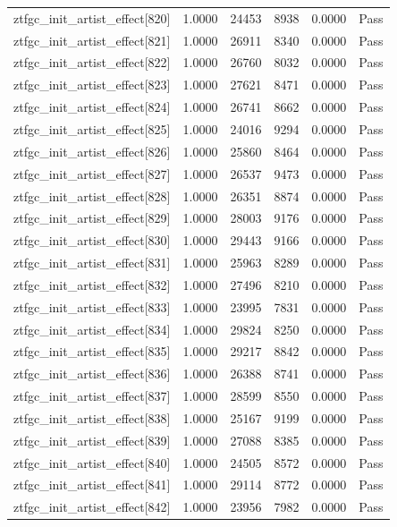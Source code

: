 \begin{table}[htbp]
\begin{tabular}{llrrll}
ztfgc\_init\_artist\_effect[820] & 1.0000 & 24453 & 8938 & 0.0000 & Pass \\
ztfgc\_init\_artist\_effect[821] & 1.0000 & 26911 & 8340 & 0.0000 & Pass \\
ztfgc\_init\_artist\_effect[822] & 1.0000 & 26760 & 8032 & 0.0000 & Pass \\
ztfgc\_init\_artist\_effect[823] & 1.0000 & 27621 & 8471 & 0.0000 & Pass \\
ztfgc\_init\_artist\_effect[824] & 1.0000 & 26741 & 8662 & 0.0000 & Pass \\
ztfgc\_init\_artist\_effect[825] & 1.0000 & 24016 & 9294 & 0.0000 & Pass \\
ztfgc\_init\_artist\_effect[826] & 1.0000 & 25860 & 8464 & 0.0000 & Pass \\
ztfgc\_init\_artist\_effect[827] & 1.0000 & 26537 & 9473 & 0.0000 & Pass \\
ztfgc\_init\_artist\_effect[828] & 1.0000 & 26351 & 8874 & 0.0000 & Pass \\
ztfgc\_init\_artist\_effect[829] & 1.0000 & 28003 & 9176 & 0.0000 & Pass \\
ztfgc\_init\_artist\_effect[830] & 1.0000 & 29443 & 9166 & 0.0000 & Pass \\
ztfgc\_init\_artist\_effect[831] & 1.0000 & 25963 & 8289 & 0.0000 & Pass \\
ztfgc\_init\_artist\_effect[832] & 1.0000 & 27496 & 8210 & 0.0000 & Pass \\
ztfgc\_init\_artist\_effect[833] & 1.0000 & 23995 & 7831 & 0.0000 & Pass \\
ztfgc\_init\_artist\_effect[834] & 1.0000 & 29824 & 8250 & 0.0000 & Pass \\
ztfgc\_init\_artist\_effect[835] & 1.0000 & 29217 & 8842 & 0.0000 & Pass \\
ztfgc\_init\_artist\_effect[836] & 1.0000 & 26388 & 8741 & 0.0000 & Pass \\
ztfgc\_init\_artist\_effect[837] & 1.0000 & 28599 & 8550 & 0.0000 & Pass \\
ztfgc\_init\_artist\_effect[838] & 1.0000 & 25167 & 9199 & 0.0000 & Pass \\
ztfgc\_init\_artist\_effect[839] & 1.0000 & 27088 & 8385 & 0.0000 & Pass \\
ztfgc\_init\_artist\_effect[840] & 1.0000 & 24505 & 8572 & 0.0000 & Pass \\
ztfgc\_init\_artist\_effect[841] & 1.0000 & 29114 & 8772 & 0.0000 & Pass \\
ztfgc\_init\_artist\_effect[842] & 1.0000 & 23956 & 7982 & 0.0000 & Pass \\

\end{tabular}
\end{table}
